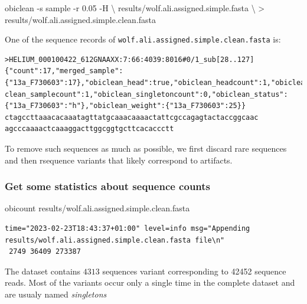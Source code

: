 \documentclass[
  letterpaper,
  DIV=11,
  numbers=noendperiod]{scrreprt}
\newenvironment{Shaded}{\begin{snugshade}}{\end{snugshade}}
\newcommand{\AttributeTok}[1]{\textcolor[rgb]{0.40,0.45,0.13}{#1}}
\newcommand{\DataTypeTok}[1]{\textcolor[rgb]{0.68,0.00,0.00}{#1}}
\newcommand{\ExtensionTok}[1]{\textcolor[rgb]{0.00,0.23,0.31}{#1}}
\newcommand{\NormalTok}[1]{\textcolor[rgb]{0.00,0.23,0.31}{#1}}
\newcommand{\OperatorTok}[1]{\textcolor[rgb]{0.37,0.37,0.37}{#1}}
\begin{document}
\begin{Shaded}
\begin{Highlighting}[]
\ExtensionTok{obiclean} \AttributeTok{{-}s}\NormalTok{ sample }\AttributeTok{{-}r}\NormalTok{ 0.05 }\AttributeTok{{-}H} \DataTypeTok{\textbackslash{}}
\NormalTok{  results/wolf.ali.assigned.simple.fasta }\DataTypeTok{\textbackslash{}}
      \OperatorTok{\textgreater{}}\NormalTok{ results/wolf.ali.assigned.simple.clean.fasta }
\end{Highlighting}
\end{Shaded}

One of the sequence records of
\texttt{wolf.ali.assigned.simple.clean.fasta} is:

\begin{verbatim}
>HELIUM_000100422_612GNAAXX:7:66:4039:8016#0/1_sub[28..127] {"count":17,"merged_sample":{"13a_F730603":17},"obiclean_head":true,"obiclean_headcount":1,"obiclean_internalcount":0,"obi
clean_samplecount":1,"obiclean_singletoncount":0,"obiclean_status":{"13a_F730603":"h"},"obiclean_weight":{"13a_F730603":25}}
ctagccttaaacacaaatagttatgcaaacaaaactattcgccagagtactaccggcaac
agcccaaaactcaaaggacttggcggtgcttcacaccctt
\end{verbatim}

To remove such sequences as much as possible, we first discard rare
sequences and then rsequence variants that likely correspond to
artifacts.

\hypertarget{get-some-statistics-about-sequence-counts}{%
\subsubsection*{Get some statistics about sequence
counts}\label{get-some-statistics-about-sequence-counts}}

\begin{Shaded}
\begin{Highlighting}[]
\ExtensionTok{obicount}\NormalTok{ results/wolf.ali.assigned.simple.clean.fasta}
\end{Highlighting}
\end{Shaded}

\begin{verbatim}
time="2023-02-23T18:43:37+01:00" level=info msg="Appending results/wolf.ali.assigned.simple.clean.fasta file\n"
 2749 36409 273387
\end{verbatim}

The dataset contains \(4313\) sequences variant corresponding to 42452
sequence reads. Most of the variants occur only a single time in the
complete dataset and are usualy named \emph{singletons}
\end{document}
